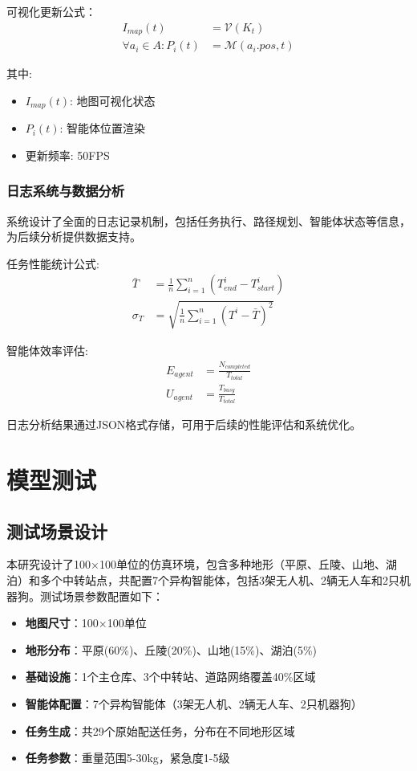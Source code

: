 \documentclass[12pt,a4paper]{article}
\begin{document}
可视化更新公式：
\begin{align}
I_{map}(t) &= \mathcal{V}(K_t) \\
\forall a_i \in A: P_i(t) &= \mathcal{M}(a_i.pos, t)
\end{align}

其中:
\begin{itemize}
    \item $I_{map}(t)$: 地图可视化状态
    \item $P_i(t)$: 智能体位置渲染
    \item 更新频率: 50FPS
\end{itemize}

\subsubsection{日志系统与数据分析}

系统设计了全面的日志记录机制，包括任务执行、路径规划、智能体状态等信息，为后续分析提供数据支持。

任务性能统计公式:
\begin{align}
\bar{T} &= \frac{1}{n}\sum_{i=1}^{n}(T_{end}^i - T_{start}^i) \\
\sigma_T &= \sqrt{\frac{1}{n}\sum_{i=1}^{n}(T^i - \bar{T})^2}
\end{align}

智能体效率评估:
\begin{align}
E_{agent} &= \frac{N_{completed}}{T_{total}} \\
U_{agent} &= \frac{T_{busy}}{T_{total}}
\end{align}

日志分析结果通过JSON格式存储，可用于后续的性能评估和系统优化。

\section{模型测试}

\subsection{测试场景设计}

本研究设计了100×100单位的仿真环境，包含多种地形（平原、丘陵、山地、湖泊）和多个中转站点，共配置7个异构智能体，包括3架无人机、2辆无人车和2只机器狗。测试场景参数配置如下：

\begin{itemize}
    \item \textbf{地图尺寸}：100×100单位
    \item \textbf{地形分布}：平原(60\%)、丘陵(20\%)、山地(15\%)、湖泊(5\%)
    \item \textbf{基础设施}：1个主仓库、3个中转站、道路网络覆盖40\%区域
    \item \textbf{智能体配置}：7个异构智能体（3架无人机、2辆无人车、2只机器狗）
    \item \textbf{任务生成}：共29个原始配送任务，分布在不同地形区域
    \item \textbf{任务参数}：重量范围5-30kg，紧急度1-5级
\end{itemize}
\end{document}
